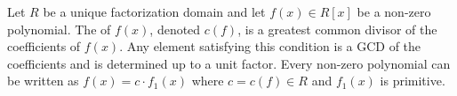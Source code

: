 Let $R$ be a unique factorization domain and let $f(x) \in R[x]$ be a non-zero polynomial. The  of $f(x)$, denoted $c(f)$, is a greatest common divisor of the coefficients of $f(x)$. Any element satisfying this condition is a GCD of the coefficients and is determined up to a unit factor. Every non-zero polynomial can be written as $f(x) = c \cdot f_1(x)$ where $c = c(f) \in R$ and $f_1(x)$ is primitive.

